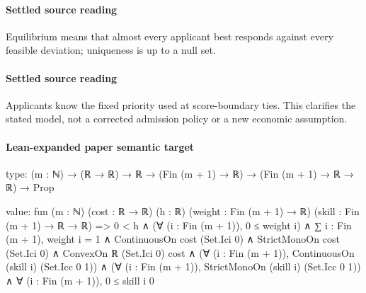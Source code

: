\documentclass[10pt]{article}
\begin{document}
\begin{ReviewVerbatim}
\begin{definition} [Equilibrium]
{{	}
	}
\end{definition}
\end{ReviewVerbatim}

\paragraph{Settled source reading}
\begin{sloppypar}
Equilibrium means that almost every applicant best responds against every feasible deviation;\allowbreak{} uniqueness is up to a null set.\allowbreak{}
\end{sloppypar}
\paragraph{Settled source reading}
\begin{sloppypar}
Applicants know the fixed priority used at score-\allowbreak{}boundary ties.\allowbreak{} This clarifies the stated model, not a corrected admission policy or a new economic assumption.\allowbreak{}
\end{sloppypar}

\paragraph{Lean-expanded paper semantic target}
\begin{ReviewVerbatim}
type:
(m : ℕ) → (ℝ → ℝ) → ℝ → (Fin (m + 1) → ℝ) → (Fin (m + 1) → ℝ → ℝ) → Prop

value:
fun (m : ℕ) (cost : ℝ → ℝ) (h : ℝ) (weight : Fin (m + 1) → ℝ) (skill : Fin (m + 1) → ℝ → ℝ) =>
  0 < h ∧
    (∀ (i : Fin (m + 1)), 0 ≤ weight i) ∧
      ∑ i : Fin (m + 1), weight i = 1 ∧
        ContinuousOn cost (Set.Ici 0) ∧
          StrictMonoOn cost (Set.Ici 0) ∧
            ConvexOn ℝ (Set.Ici 0) cost ∧
              (∀ (i : Fin (m + 1)), ContinuousOn (skill i) (Set.Icc 0 1)) ∧
                (∀ (i : Fin (m + 1)), StrictMonoOn (skill i) (Set.Icc 0 1)) ∧ ∀ (i : Fin (m + 1)), 0 ≤ skill i 0
\end{ReviewVerbatim}
\end{document}

